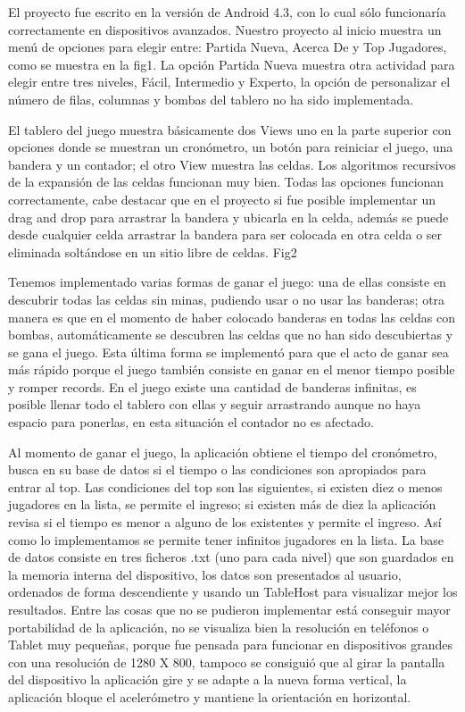 \documentclass[11pt]{article} %
\begin{document}
El proyecto fue escrito en la versión de Android 4.3, con lo cual sólo funcionaría correctamente en dispositivos avanzados.
Nuestro proyecto al inicio  muestra un menú de opciones para elegir entre: Partida Nueva, Acerca De y Top Jugadores, como se muestra en la fig1. La opción Partida Nueva muestra otra actividad para elegir entre tres niveles, Fácil, Intermedio y Experto, la opción de personalizar el número de filas, columnas y bombas del tablero no ha sido implementada. 

El tablero del juego muestra básicamente dos Views uno en la parte superior con opciones donde se muestran un cronómetro, un botón para reiniciar el juego, una bandera y un contador; el otro View muestra las celdas.  Los algoritmos recursivos de la expansión de las celdas funcionan muy bien. Todas las opciones  funcionan correctamente, cabe destacar que en el proyecto si fue posible implementar un drag and drop para arrastrar la bandera y ubicarla en la celda, además se puede desde cualquier celda arrastrar la bandera para ser colocada en otra celda o ser eliminada soltándose en un sitio libre de celdas. Fig2

Tenemos implementado varias formas de ganar el juego: una de ellas consiste en descubrir todas las celdas sin minas, pudiendo usar o no usar las banderas; otra manera es que en el momento de haber colocado banderas en todas las celdas con bombas, automáticamente se descubren las celdas que no han sido descubiertas y se gana el juego. Esta última forma se implementó para que el acto de ganar sea más rápido porque el juego también consiste en ganar en el menor tiempo posible y romper records. En el juego existe una cantidad de banderas infinitas, es posible llenar todo el tablero con ellas y seguir arrastrando aunque no haya espacio para ponerlas, en esta situación el contador no es afectado.

Al momento de ganar el juego, la aplicación obtiene el tiempo del cronómetro, busca en su base de datos si el tiempo o las condiciones son apropiados para entrar al top. Las condiciones del top son las siguientes, si existen diez o menos jugadores en la lista, se permite el ingreso; si existen más de diez la aplicación revisa si el tiempo es menor a alguno de los existentes y permite el ingreso.  Así como lo implementamos se permite tener infinitos jugadores en la lista.
La base de datos consiste en tres  ficheros .txt (uno para cada nivel) que son guardados en la memoria interna del dispositivo, los datos son presentados al usuario, ordenados de forma descendiente y usando un TableHost para visualizar mejor los resultados.
Entre las cosas que no se pudieron implementar está conseguir mayor portabilidad de la aplicación, no se visualiza bien la resolución en teléfonos o Tablet muy pequeñas, porque fue pensada para funcionar en dispositivos grandes con una resolución de 1280 X 800, tampoco se consiguió que al girar la pantalla del dispositivo la aplicación gire y se adapte a la nueva forma vertical, la aplicación bloque el acelerómetro y mantiene la orientación en horizontal. 
\end{document}
